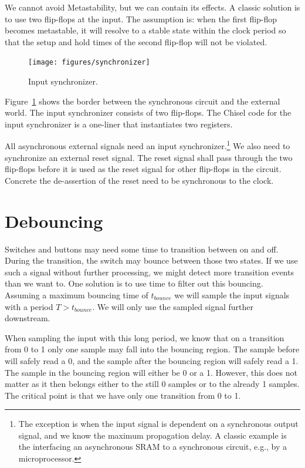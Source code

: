 \documentclass[%
    10pt,
    headinclude, footexclude,
    openright, %
    notitlepage,
    cleardoubleempty,
    headsepline,
    pointlessnumbers,
    bibtotoc, idxtotoc,
    ]{scrbook}
\begin{document}
We cannot avoid Metastability, but we can contain its effects.
A classic solution is to use two flip-flops at the input. The assumption is:
when the first flip-flop becomes metastable, it will resolve to a stable
state within the clock period so that the setup and hold times of the
second flip-flop will not be violated.

\begin{figure}
  \centering
  \texttt{[image: figures/synchronizer]}
  \caption{Input synchronizer.}
  \label{fig:synchronizer}
\end{figure}

Figure~\ref{fig:synchronizer} shows the border between the synchronous
circuit and the external world. The input synchronizer consists of
two flip-flops. The Chisel code for the input synchronizer is a one-liner that
instantiates two registers.


All asynchronous external signals need an input
synchronizer.\footnote{The exception is when the input signal is dependent
on a synchronous output signal, and we know the maximum propagation delay.
A classic example is the interfacing an asynchronous SRAM
to a synchronous circuit, e.g., by a microprocessor.}
We also need to synchronize an external reset signal. The reset signal
shall pass through the two flip-flops before it is used as the reset signal
for other flip-flops in the circuit. Concrete the de-assertion of the reset need
to be synchronous to the clock.

\section{Debouncing}

Switches and buttons may need some time to transition between on and off.
During the transition, the switch may bounce between those two states.
If we use such a signal without further processing, we might detect more
transition events than we want to. One solution is to use time to filter out
this bouncing. Assuming a maximum bouncing time of $t_{bounce}$ we will sample the
input signals with a period $T > t_{bounce}$. We will only use the
sampled signal further downstream.

When sampling the input with this long period, we know that on a transition
from 0 to 1 only one sample may fall into the bouncing region.
The sample before will safely read a 0, and the sample after the bouncing
region will safely read a 1. The sample in the bouncing region will
either be  0 or a 1. However, this does not matter as it then belongs either
to the still 0 samples or to the already 1 samples. The critical point
is that we have only one transition from 0 to 1.
\end{document}

